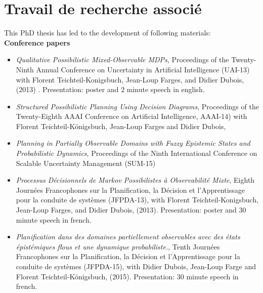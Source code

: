 \chapter*{Travail de recherche associ\'e}

This PhD thesis has led to the development of following materials:\\

\textbf{Conference papers}
\begin{itemize}
\item \textit{Qualitative {P}ossibilistic {M}ixed-{O}bservable {MDP}s}, 
Proceedings of the Twenty-Ninth Annual Conference on Uncertainty in Artificial Intelligence (UAI-13) 
with Florent Teichteil-Konigsbuch, Jean-Loup Farges, and Didier Dubois, (2013) \cite{Drougard13}. Presentation: poster and $2$ minute speech in english.
\item \textit{Structured Possibilistic Planning Using Decision Diagrams}, 
Proceedings of the Twenty-Eighth {AAAI} Conference on Artificial Intelligence,
AAAI-14) with Florent Teichteil{-}K{\"{o}}nigsbuch, Jean-Loup Farges and Didier Dubois,
\item \textit{Planning in Partially Observable Domains with Fuzzy Epistemic States and Probabilistic Dynamics},
Proceedings of the Ninth International Conference on Scalable Uncertainty Management (SUM-15)
\item \textit{Processus D\'ecisionnels de Markov Possibilistes \`a Observabilit\'e Mixte},
Eighth Journ\'ees Francophones sur la Planification, la D\'ecision et l'Apprentissage pour la conduite de syst\`emes (JFPDA-13),
with Florent Teichteil-Konigsbuch, Jean-Loup Farges, and Didier Dubois, (2013). Presentation: poster and $30$ minute speech in french.
\item \textit{Planification dans des domaines partiellement
observables avec des \'etats \'epist\'emiques flous
et une dynamique probabiliste.},
Tenth Journ\'ees Francophones sur la Planification, la D\'ecision et l'Apprentissage pour la conduite de syst\`emes (JFPDA-15),
with Didier Dubois, Jean-Loup Farge and Florent Teichteil-K\"onigsbuch, (2015). Presentation: $30$ minute speech in french.
\end{itemize}

